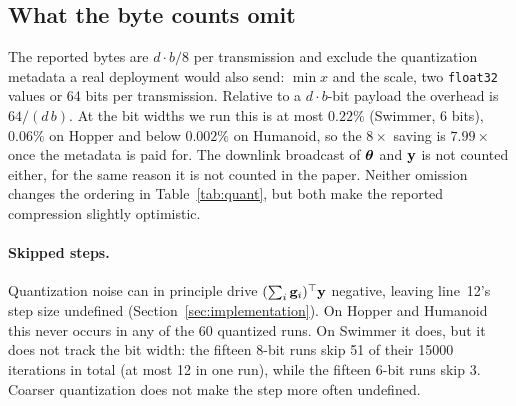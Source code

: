 \subsection{What the byte counts omit}

The reported bytes are $d \cdot b / 8$ per transmission and exclude the
quantization metadata a real deployment would also send: $\min x$ and the
scale, two \texttt{float32} values or 64 bits per transmission. Relative to a
$d \cdot b$-bit payload the overhead is $64/(d\,b)$. At the bit widths we run
this is at most $0.22\%$ (Swimmer, 6 bits), $0.06\%$ on Hopper and below
$0.002\%$ on Humanoid, so the $8\times$ saving is $7.99\times$ once the
metadata is paid for. The downlink broadcast of $\boldsymbol{\theta}$ and $\mathbf{y}$ is not
counted either, for the same reason it is not counted in the paper. Neither
omission changes the ordering in Table~\ref{tab:quant}, but both make the
reported compression slightly optimistic.

\paragraph{Skipped steps.} Quantization noise can in principle drive
$(\sum_i \mathbf{g}_i)^{\top}\mathbf{y}$ negative, leaving line~12's step size undefined
(Section~\ref{sec:implementation}). On Hopper and Humanoid this never occurs
in any of the 60 quantized runs. On Swimmer it does, but it does not track the
bit width: the fifteen 8-bit runs skip 51 of their \num{15000} iterations in
total (at most 12 in one run), while the fifteen 6-bit runs skip 3. Coarser
quantization does not make the step more often undefined.

